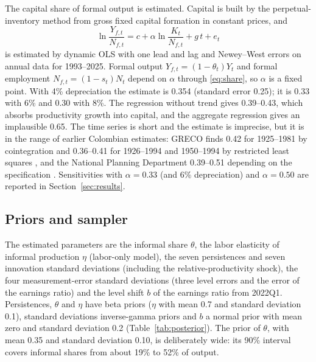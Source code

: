 The capital share of formal output is estimated. Capital is built by the perpetual-inventory method from gross fixed capital formation in constant prices, and
\begin{equation}
\ln\frac{Y_{f,t}}{N_{f,t}} = c + \alpha\ln\frac{K_t}{N_{f,t}} + g\,t + e_t
\label{eq:dols}
\end{equation}
is estimated by dynamic OLS \citep{StockWatson1993} with one lead and lag and Newey--West errors on annual data for 1993--2025. Formal output $Y_{f,t}=(1-\theta_t)Y_t$ and formal employment $N_{f,t}=(1-s_t)N_t$ depend on $\alpha$ through \eqref{eq:share}, so $\alpha$ is a fixed point. With 4\% depreciation the estimate is 0.354 (standard error 0.25); it is 0.33 with 6\% and 0.30 with 8\%. The regression without trend gives 0.39--0.43, which absorbs productivity growth into capital, and the aggregate regression gives an implausible 0.65. The time series is short and the estimate is imprecise, but it is in the range of earlier Colombian estimates: GRECO finds 0.42 for 1925--1981 by cointegration and 0.36--0.41 for 1926--1994 and 1950--1994 by restricted least squares \citep{GRECO1999}, and the National Planning Department 0.39--0.51 depending on the specification \citep{RodriguezPerillaReyes2004}. Sensitivities with $\alpha=0.33$ (and 6\% depreciation) and $\alpha=0.50$ are reported in Section~\ref{sec:results}.

\subsection{Priors and sampler}

The estimated parameters are the informal share $\theta$, the labor elasticity of informal production $\eta$ (labor-only model), the seven persistences and seven innovation standard deviations (including the relative-productivity shock), the four measurement-error standard deviations (three level errors and the error of the earnings ratio) and the level shift $b$ of the earnings ratio from 2022Q1. Persistences, $\theta$ and $\eta$ have beta priors ($\eta$ with mean 0.7 and standard deviation 0.1), standard deviations inverse-gamma priors and $b$ a normal prior with mean zero and standard deviation 0.2 (Table~\ref{tab:posterior}). The prior of $\theta$, with mean 0.35 and standard deviation 0.10, is deliberately wide: its 90\% interval covers informal shares from about 19\% to 52\% of output.


